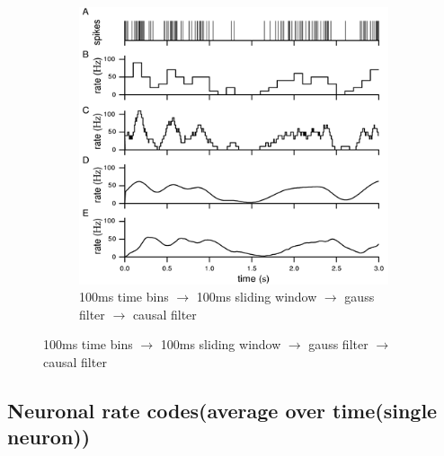 \documentclass[english,11pt]{article}
\begin{document}
\begin{figure}[H]
\begin{subfigure}[b]{0.5\textwidth}
				\includegraphics[width=\textwidth]{firing-rate.png}
				\caption{100ms time bins $\rightarrow$ 100ms sliding window $\rightarrow$ gauss filter $\rightarrow$ causal filter}
        \end{subfigure}
\end{figure}


\subsection{Neuronal rate codes(average over time(single neuron))}
\end{document}
